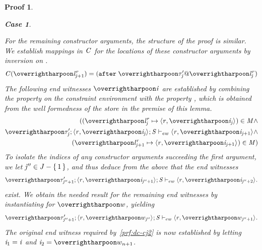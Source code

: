 \documentclass[showabstract,showacknowledgments,showpreface,showdedication]{iuphd}
\newtheorem*{bcase}{Case}
\theoremstyle{nonumberplain}
\newtheorem{nproof}{Proof}
\begin{document}
\begin{nproof}
\begin{bcase}
\begin{itemize}
\begin{itemize}
\begin{itemize}
           For the remaining constructor arguments, the structure of the proof is similar.
           We establish mappings in $\mathit{C}$ for the locations of these constructor arguments
           by inversion on \tdatacon{}.
           \begin{align*}
           \CENV(\overharpoon{\locreg{\loc}{\reg}_{\indj+1}}) = \afterl{\overharpoon{\TYP'_{\indj}} \ensuremath{@} \overharpoon{\locreg{\loc}{\reg}_{\indj}}}
           \end{align*}
           The following end witnesses $\overharpoon{\ind}$ are established by combining the property
           on the constraint environment
           with the property 
           ,
           which is obtained from the well formedness of the store in the premise of this lemma.
           \begin{align*}
           ((\overharpoon{\locreg{\loc}{\reg}_{\indj}} \mapsto \concreteloc{\reg}{\overharpoon{\ind_{\indj}}}{}) \in \MENV \wedge \\
                       \ewitness{\overharpoon{\TYP'_{\indj}}}{\concreteloc{\reg}{\overharpoon{\ind_{\indj}}}{}}{\STOR}{\concreteloc{\reg}{\overharpoon{\ind_{\indj+1}}}{}} \wedge \\
                       (\overharpoon{\locreg{\loc}{\reg}_{\indj+1}} \mapsto \concreteloc{\reg}{\overharpoon{\ind_{\indj+1}}}{}) \in \MENV)
           \end{align*}
           To isolate the indices of any constructor arguments succeeding the
           first argument, we let $\mathit{j}'' \in J - \{ \, 1 \,\}$, and thus deduce
           from the above that the end witnesses
           \begin{align*}
           \ewitness{\overharpoon{\TYP_{\indj''+1}'}}{\concreteloc{\reg}{\overharpoon{\ind_{\indj''+1}}}{}}{\STOR}{\concreteloc{\reg}{\overharpoon{\ind_{\indj'' + 2}}}{}}.
           \end{align*}
           exist.
           We obtain the needed result for the remaining end witnesses
           by instantiating for $\overharpoon{w}$, yielding
           \begin{align}
           \ewitness{\overharpoon{\TYP_{\indj''+1}'}}{\concreteloc{\reg}{\overharpoon{w_{\indj''}}}{}}{\STOR}{\concreteloc{\reg}{\overharpoon{w_{\indj'' + 1}}}{}} \label{prf:dc-ew-f2}.
           \end{align}
           The original end witness required by~\ref{prf:dc-cj2} is now established by letting
           $\mathit{i}_1 = \mathit{i}$ and $\ind_2 = \overharpoon{w_{n+1}}$.
           

\end{itemize}
\end{itemize}
\end{itemize}
\end{bcase}
\end{nproof}
\end{document}
